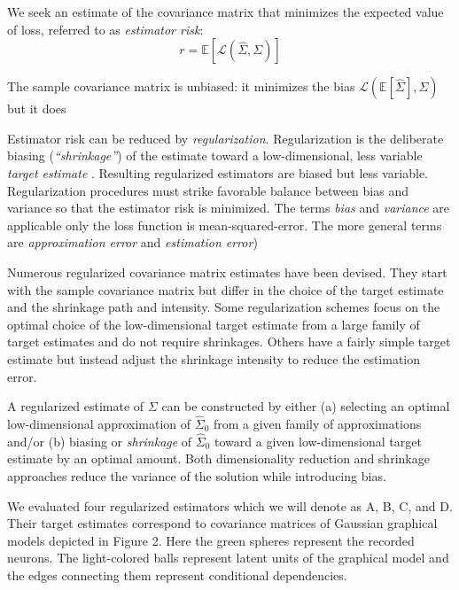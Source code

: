 We seek an estimate of the covariance matrix that minimizes the expected value of loss, referred to as \emph{estimator risk}: 
\begin{equation}
r = \mathbb E[\mathcal L(\hat\Sigma, \Sigma)]
\end{equation}

The sample covariance matrix is unbiased: it minimizes the bias $\mathcal L (\mathbb E[\hat\Sigma],\Sigma)$ but it does

Estimator risk can be reduced by \emph{regularization}. Regularization is the deliberate biasing (\emph{``shrinkage''}) of the estimate toward a low-dimensional, less variable \emph{target estimate} \cite{Bickel:2006,Ledoit:2004}.  Resulting regularized estimators are biased but  less variable. Regularization procedures must strike favorable balance between bias and variance so that the estimator risk is minimized. The terms \emph{bias} and \emph{variance} are applicable only the loss function is mean-squared-error. The more general terms are \emph{approximation error} and \emph{estimation error})

Numerous regularized covariance matrix estimates have been devised. They start with the sample covariance matrix but differ in the choice of the target estimate and the shrinkage path and intensity. Some regularization schemes focus on the optimal choice of the low-dimensional target estimate from a large family of target estimates and do not require shrinkages.  Others have a fairly simple target estimate but instead adjust the shrinkage intensity to reduce the estimation error.

A regularized estimate of $\Sigma$ can be constructed by either (a) selecting an optimal low-dimensional approximation of $\hat\Sigma_0$ from a given family of approximations and/or (b) biasing or \emph{shrinkage} of $\hat\Sigma_0$ toward a given low-dimensional target estimate by an optimal amount.  Both dimensionality reduction and shrinkage approaches reduce the variance of the solution while introducing bias. 


We evaluated four regularized estimators which we will denote as A, B, C, and D.  Their target estimates correspond to covariance matrices of Gaussian graphical models depicted in Figure 2.  Here the green spheres represent the recorded neurons. The light-colored balls represent latent units of the graphical model and the edges connecting them represent conditional dependencies.



